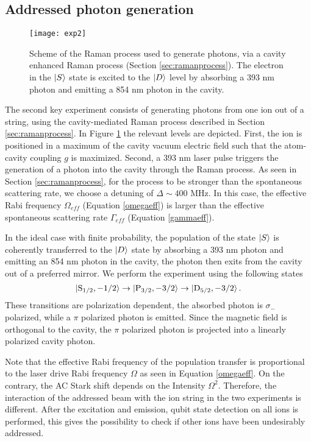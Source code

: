 \subsection{Addressed photon generation}
\label{sec:expphoton}
\begin{figure}
\centering
\texttt{[image: exp2]}
\caption{Scheme of the Raman process used to generate photons, via a cavity enhanced Raman process (Section \ref{sec:ramanprocess}). The electron in the $\ket{S}$ state is excited to the $\ket{D}$ level by absorbing a 393 nm photon and emitting a 854 nm photon in the cavity.}
\label{img:sec2}
\end{figure}
The second key experiment consists of generating photons from one ion out of a string, using the cavity-mediated Raman process described in Section \ref{sec:ramanprocess}. In Figure \ref{img:sec2} the relevant levels are depicted. First, the ion is positioned in a maximum of the cavity vacuum electric field such that the atom-cavity coupling $g$ is maximized. Second, a 393 nm laser pulse triggers the generation of a photon into the cavity through the Raman process. As seen in Section \ref{sec:ramanprocess}, for the process to be stronger than the spontaneous scattering rate, we choose a detuning of $\Delta \sim 400$ MHz. In this case, the effective Rabi frequency $\Omega_{eff}$ (Equation \eqref{omegaeff}) is larger than the effective spontaneous scattering rate $\Gamma_{eff}$ (Equation \eqref{gammaeff}).\par
In the ideal case with finite probability, the population of the state $\ket{S}$ is coherently transferred to the $\ket{D}$ state by absorbing a 393 nm photon and emitting an 854 nm photon in the cavity, the photon then exits from the cavity out of a preferred mirror. We perform the experiment using the following states
\begin{equation}
\ket{\text{S}_{1/2},-1/2} \to \ket{\text{P}_{3/2},-3/2} \to \ket{\text{D}_{5/2},-3/2}.
\end{equation}
These transitions are polarization dependent, the absorbed photon is $\sigma_-$ polarized, while a $\pi$ polarized photon is emitted. Since the magnetic field is orthogonal to the cavity, the $\pi$ polarized photon is projected into a linearly polarized cavity photon.\par
Note that the effective Rabi frequency of the population transfer is proportional to the laser drive Rabi frequency $\Omega$ as seen in Equation \eqref{omegaeff}. On the contrary, the AC Stark shift depends on the Intensity $\Omega^2$. Therefore, the interaction of the addressed beam with the ion string in the two experiments is different. After the excitation and emission, qubit state detection on all ions is performed, this gives the possibility to check if other ions have been undesirably addressed.
